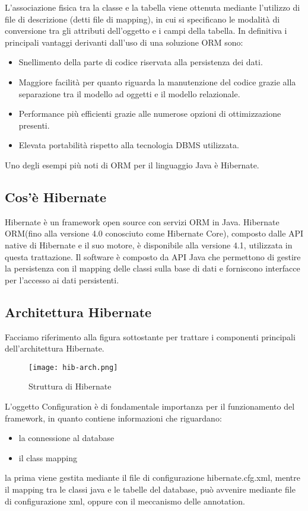 L'associazione fisica tra la classe e la tabella viene ottenuta mediante l'utilizzo di file di descrizione (detti file di mapping), in cui si specificano le modalit\`a di conversione tra gli attributi dell'oggetto e i campi della tabella. In definitiva i principali vantaggi derivanti dall'uso di una soluzione ORM sono:

\begin{itemize}
\item Snellimento della parte di codice riservata alla persistenza dei dati.
\item Maggiore facilit\`a per quanto riguarda la manutenzione del codice grazie alla separazione tra il modello ad oggetti e il modello relazionale.
\item Performance pi\`u efficienti grazie alle numerose opzioni di ottimizzazione presenti.
\item Elevata portabilit\`a rispetto alla tecnologia DBMS utilizzata.
\end{itemize}

Uno degli esempi pi\`u noti di ORM per il linguaggio Java \`e Hibernate.
\subsection{Cos'\`e Hibernate}
Hibernate \`e un framework open source
con servizi ORM in Java. Hibernate ORM(fino alla versione 4.0 conosciuto come Hibernate Core), composto dalle API native di Hibernate e il suo motore, \`e disponibile alla versione 4.1, utilizzata in questa trattazione.
Il software \`e composto da API Java che permettono di gestire la persistenza con il mapping delle classi sulla base di dati e forniscono interfacce per l'accesso ai dati persistenti.
\subsection{Architettura Hibernate}
Facciamo riferimento alla figura sottostante per  trattare i componenti principali dell'architettura Hibernate.

\FloatBarrier
\begin{figure}[H]
\centering%
\texttt{[image: hib-arch.png]}%
\caption{Struttura di Hibernate}\label{fig:hibernate}%
\end{figure}

L'oggetto Configuration \`e di fondamentale importanza per il funzionamento del framework, in quanto contiene informazioni che riguardano:
\begin{itemize}
\item la connessione al database
\item il class mapping
\end{itemize}
la prima viene gestita mediante il file di configurazione hibernate.cfg.xml, mentre il mapping tra le classi java e le tabelle del database, pu\`o avvenire mediante file di configurazione xml, oppure con il meccanismo delle annotation. 

